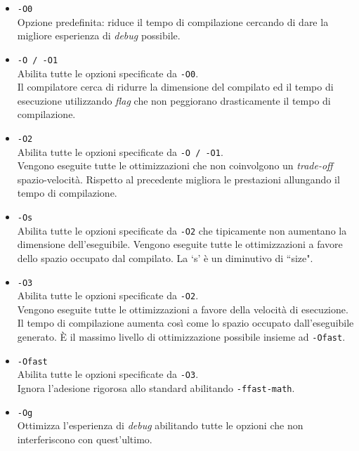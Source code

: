 \begin{itemize}
  
  \item \verb|-O0|\\
  Opzione predefinita: riduce il tempo di compilazione cercando di dare la 
  migliore esperienza di \emph{debug} possibile.
  
  \item \verb|-O / -O1|\\
  Abilita tutte le opzioni specificate da \verb|-O0|.\\
  Il compilatore cerca di ridurre la dimensione del compilato ed il tempo di 
  esecuzione utilizzando \emph{flag} che non peggiorano drasticamente il tempo 
  di compilazione.
  
  \item \verb|-O2|\\
  Abilita tutte le opzioni specificate da \verb|-O / -O1|.\\
  Vengono eseguite tutte le ottimizzazioni che non coinvolgono un 
  \emph{trade-off} spazio-velocità. Rispetto al precedente migliora le 
  prestazioni allungando il tempo di compilazione.
  
  \item \verb|-Os|\\
  Abilita tutte le opzioni specificate da \verb|-O2| che tipicamente non 
  aumentano la dimensione dell'eseguibile. Vengono eseguite tutte le 
  ottimizzazioni a favore dello spazio occupato dal compilato. La `s' è un 
  diminutivo di ``size".
  
  \item \verb|-O3|\\
  Abilita tutte le opzioni specificate da \verb|-O2|.\\
  Vengono eseguite tutte le ottimizzazioni a favore della velocità di 
  esecuzione. 
  Il tempo di compilazione aumenta così come lo spazio occupato dall'eseguibile 
  generato. \`E il massimo livello di ottimizzazione possibile insieme ad 
  \verb|-Ofast|.
  
  \item \verb|-Ofast|\\
  Abilita tutte le opzioni specificate da \verb|-O3|.\\
  Ignora l'adesione rigorosa allo standard abilitando \verb|-ffast-math|.
  
  \item \verb|-Og|\\
  Ottimizza l'esperienza di \emph{debug} abilitando tutte le opzioni che non 
  interferiscono con quest'ultimo.
  
\end{itemize}


